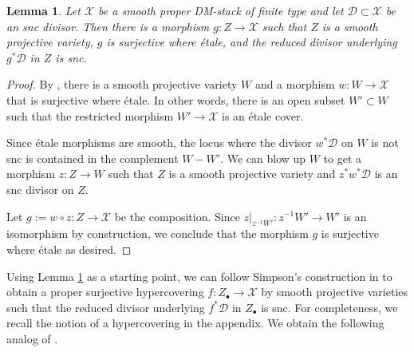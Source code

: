 \documentclass[a4paper]{amsart}
\newtheorem{lemma}[theorem]{Lemma}
\theoremstyle{definition}
\begin{document}
\begin{lemma}\label{Surj-etale-lem}
Let $\mathscr{X}$ be a smooth proper DM-stack of finite type and let $\mathscr{D}\subset \mathscr{X}$ be an snc divisor. Then there is a morphism $g:Z\to \mathscr{X}$ such that $Z$ is a smooth projective variety, $g$ is surjective where \'etale, and the reduced divisor underlying $g^*\mathscr{D}$ in $Z$ is snc.
\end{lemma}
\begin{proof}
By \cite[Theorem 5.4]{simpsonstacks}, there is a smooth projective variety $W$ and a morphism $w:W\to\mathscr{X}$ that is surjective where \'etale. In other words, there is an open subset $W'\subset W$ such that the restricted morphism $W'\to\mathscr{X}$ is an \'etale cover.

Since \'etale morphisms are smooth, the locus where the divisor $w^*\mathscr{D}$ on $W$ is not snc is contained in the complement $W-W'$. We can blow up $W$ to get a morphism $z:Z\to W$ such that $Z$ is a smooth projective variety and $z^*w^*\mathscr{D}$ is an snc divisor on $Z$. 

Let $g:=w\circ z:Z\to\mathscr{X}$ be the composition. Since $z|_{z^{-1}W'}:z^{-1}W'\to W'$ is an isomorphism by construction, we conclude that the morphism $g$ is surjective where \'etale as desired.
\end{proof}

Using Lemma \ref{Surj-etale-lem} as a starting point, we can follow Simpson's construction in \cite[Section 5]{simpsonstacks} to obtain a proper surjective hypercovering $f:Z_\bullet\to \mathscr{X}$ by smooth projective varieties such that the reduced divisor underlying $f^*\mathscr{D}$ in $Z_\bullet$ is snc. For completeness, we recall the notion of a hypercovering in the appendix. We obtain the following analog of \cite[Theorem 5.8]{simpsonstacks}.
\end{document}
